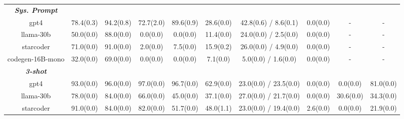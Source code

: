 \begin{table}[]
\begin{adjustbox}{max width=\textwidth}
\begin{tabular}{@{}cccccccccc@{}}
\cmidrule(lr){1-10}
\textit{\textbf{Sys. Prompt}}                 & \multicolumn{1}{l}{} & \multicolumn{1}{l}{} & \multicolumn{1}{l}{} & \multicolumn{1}{l}{} & \multicolumn{1}{l}{} & \multicolumn{1}{l}{}  & \multicolumn{1}{l}{} & \multicolumn{1}{l}{} & \multicolumn{1}{l}{} \\
gpt4                                          & 78.4(0.3)            & 94.2(0.8)            & 72.7(2.0)            & 89.6(0.9)            & 28.6(0.0)            & 42.8(0.6) / 8.6(0.1)  & 0.0(0.0)             & -                    & -                    \\
llama-30b                                     & 50.0(0.0)            & 88.0(0.0)            & 0.0(0.0)             & 0.0(0.0)             & 11.4(0.0)            & 24.0(0.0) / 2.5(0.0)  & 0.0(0.0)             & -                    & -                    \\
starcoder                                     & 71.0(0.0)            & 91.0(0.0)            & 2.0(0.0)             & 7.5(0.0)             & 15.9(0.2)            & 26.0(0.0) / 4.9(0.0)  & 0.0(0.0)             & -                    & -                    \\
codegen-16B-mono                              & 32.0(0.0)            & 69.0(0.0)            & 0.0(0.0)             & 0.0(0.0)             & 7.1(0.0)             & 5.0(0.0) / 1.6(0.0)   & 0.0(0.0)             & -                    & -                    \\
\cmidrule(lr){1-10}
\textit{\textbf{3-shot}}                      & \multicolumn{1}{l}{} & \multicolumn{1}{l}{} & \multicolumn{1}{l}{} & \multicolumn{1}{l}{} & \multicolumn{1}{l}{} & \multicolumn{1}{l}{}  & \multicolumn{1}{l}{} & \multicolumn{1}{l}{} & \multicolumn{1}{l}{} \\
gpt4                                          & 93.0(0.0)             & 96.0(0.0)             & 97.0(0.0)             & 96.7(0.0)             & 62.9(0.0)            & 23.0(0.0) / 23.5(0.0)   & 0.0(0.0)             & 0.0(0.0)             & 81.0(0.0)             \\
llama-30b                                     & 78.0(0.0)            & 84.0(0.0)            & 66.0(0.0)            & 45.0(0.0)            & 37.1(0.0)            & 27.0(0.0) / 21.7(0.0) & 0.0(0.0)             & 30.6(0.0)            & 34.3(0.0)            \\
starcoder                                     & 91.0(0.0)            & 84.0(0.0)            & 82.0(0.0)            & 51.7(0.0)            & 48.0(1.1)            & 23.0(0.0) / 19.4(0.0) & 2.6(0.0)             & 0.0(0.0)             & 21.9(0.0)            \\

\end{tabular}
\end{adjustbox}
\end{table}
